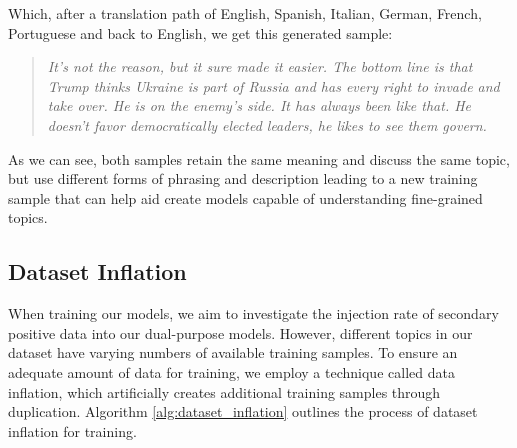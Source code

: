 Which, after a translation path of English, Spanish, Italian, German, French, Portuguese and back to English, we get this generated sample:

\begin{quote}
    \textit{It's not the reason, but it sure made it easier. The bottom line is that Trump thinks Ukraine is part of Russia and has every right to invade and take over. He is on the enemy's side. It has always been like that. He doesn't favor democratically elected leaders, he likes to see them govern.}
\end{quote}

As we can see, both samples retain the same meaning and discuss the same topic, but use different forms of phrasing and description leading to a new training sample that can help aid create models capable of understanding fine-grained topics.

\begin{table}[ht]
    \caption{Number of original, new and total samples of training data after performing data augmentation. The augmentation rate is the number of new samples per original sample. Total number of samples per dataset can be found in Appendix \ref{app:number_data_samples}.}
    \label{tab:data_aug_results}
\end{table}

\subsection{Dataset Inflation}
\label{dataset_inflation}

When training our models, we aim to investigate the injection rate of secondary positive data into our dual-purpose models. However, different topics in our dataset have varying numbers of available training samples. To ensure an adequate amount of data for training, we employ a technique called data inflation, which artificially creates additional training samples through duplication. Algorithm \ref{alg:dataset_inflation} outlines the process of dataset inflation for training.

